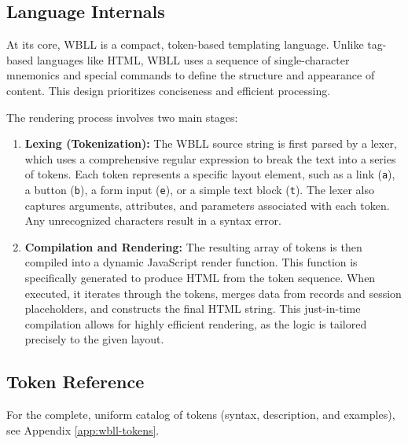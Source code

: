 \subsection{Language Internals}

At its core, WBLL is a compact, token-based templating language. Unlike tag-based languages like HTML, WBLL uses a sequence of single-character mnemonics and special commands to define the structure and appearance of content. This design prioritizes conciseness and efficient processing.

The rendering process involves two main stages:

\begin{enumerate}
    \item \textbf{Lexing (Tokenization):} The WBLL source string is first parsed by a lexer, which uses a comprehensive regular expression to break the text into a series of tokens. Each token represents a specific layout element, such as a link (\texttt{a}), a button (\texttt{b}), a form input (\texttt{e}), or a simple text block (\texttt{t}). The lexer also captures arguments, attributes, and parameters associated with each token. Any unrecognized characters result in a syntax error.
    
    \item \textbf{Compilation and Rendering:} The resulting array of tokens is then compiled into a dynamic JavaScript render function. This function is specifically generated to produce HTML from the token sequence. When executed, it iterates through the tokens, merges data from records and session placeholders, and constructs the final HTML string. This just-in-time compilation allows for highly efficient rendering, as the logic is tailored precisely to the given layout.
\end{enumerate}


\subsection{Token Reference}

For the complete, uniform catalog of tokens (syntax, description, and examples), see Appendix \ref{app:wbll-tokens}.

